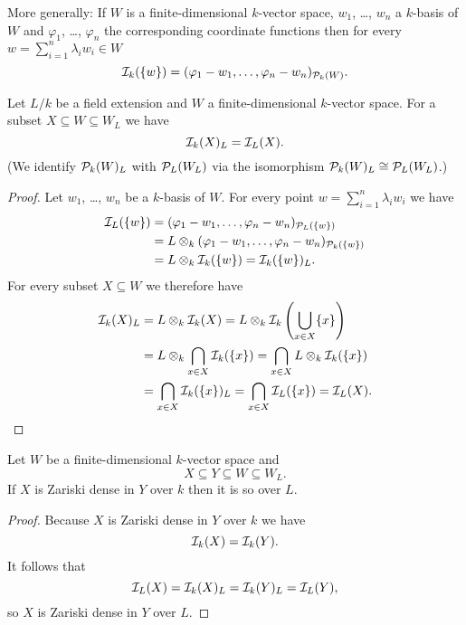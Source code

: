 More generally: If $W$ is a finite-dimensional $k$-vector space, $w_1$, \dots, $w_n$ a $k$-basis of $W$ and $\varphi_1$, \dots, $\varphi_n$ the corresponding coordinate functions then for every $w = \sum_{i=1}^n \lambda_i w_i \in W$
\[
 \mathcal{I}_k(\{w\}) = (\varphi_1 - w_1, \dotsc, \varphi_n - w_n)_{\mathcal{P}_k(W)}.
\]


\begin{lem}
 Let $L/k$ be a field extension and $W$ a finite-dimensional $k$-vector space. For a subset $X \subseteq W \subseteq W_L$ we have
 \[
  \mathcal{I}_k(X)_L = \mathcal{I}_L(X).
 \]
 (We identify $\mathcal{P}_k(W)_L$ with $\mathcal{P}_L(W_L)$ via the isomorphism $\mathcal{P}_k(W)_L \cong \mathcal{P}_L(W_L)$.)
\end{lem}
\begin{proof}
 Let $w_1$, \dots, $w_n$ be a $k$-basis of $W$. For every point $w = \sum_{i=1}^n \lambda_i w_i$ we have
 \begin{align*}
  \mathcal{I}_L(\{w\})
  &= (\varphi_1 - w_1, \dotsc, \varphi_n - w_n)_{\mathcal{P}_L(\{w\})} \\
  &= L \otimes_k (\varphi_1 - w_1, \dotsc, \varphi_n - w_n)_{\mathcal{P}_k(\{w\})} \\
  &= L \otimes_k \mathcal{I}_k(\{w\})
  = \mathcal{I}_k(\{w\})_L.
 \end{align*}
 For every subset $X \subseteq W$ we therefore have
 \begin{align*}
  \mathcal{I}_k(X)_L
  &= L \otimes_k \mathcal{I}_k(X)
  = L \otimes_k \mathcal{I}_k\left(\bigcup_{x \in X} \{x\}\right) \\
  &= L \otimes_k \bigcap_{x \in X} \mathcal{I}_k(\{x\})
  = \bigcap_{x \in X} L \otimes_k \mathcal{I}_k(\{x\}) \\
  &= \bigcap_{x \in X} \mathcal{I}_k(\{x\})_L
  = \bigcap_{x \in X} \mathcal{I}_L(\{x\})
  = \mathcal{I}_L(X).
  \qedhere
 \end{align*}
\end{proof}


\begin{cor}\label{cor: Zariski dense scalar extension}
 Let $W$ be a finite-dimensional $k$-vector space and
 \[
  X \subseteq Y \subseteq W \subseteq W_L.
 \]
 If $X$ is Zariski dense in $Y$ over $k$ then it is so over $L$.
\end{cor}
\begin{proof}
 Because $X$ is Zariski dense in $Y$ over $k$ we have
 \[
  \mathcal{I}_k(X) = \mathcal{I}_k(Y).
 \]
 It follows that
 \[
  \mathcal{I}_L(X) = \mathcal{I}_k(X)_L = \mathcal{I}_k(Y)_L = \mathcal{I}_L(Y),
 \]
 so $X$ is Zariski dense in $Y$ over $L$.
\end{proof}


